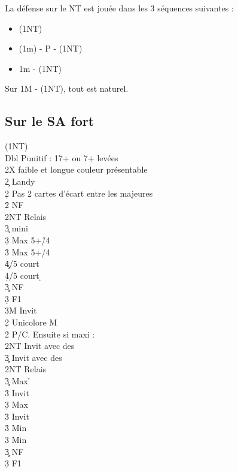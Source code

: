 \documentclass[a4paper]{article}
\begin{document}
La défense sur le NT est jouée dans les 3 séquences suivantes :

\begin{itemize}
\item (1NT)

\item (1m) - P - (1NT)

\item 1m - (1NT)

\end{itemize}

Sur 1M - (1NT), tout est naturel.

\subsection{Sur le SA fort}

\begin{bidtable}
(1NT)\+\\
Dbl \> Punitif : 17+ ou 7+ levées\\
\>2X faible et longue couleur présentable\\
2\c \> Landy\+\\
2\d \> Pas 2 cartes d'écart entre les majeures\\
2\h\s \> NF\\
2NT \> Relais\+\\
3\c \> mini\\
3\d \> Max 5+\h /4\s \\
3\h \> Max 5+\s /4\h \\
4\c {}/5 court \c \\
4\d {}/5 court \d \-\\
3\c \> NF\\
3\d \> F1\\
3M \> Invit\-\\
2\d \> Unicolore M\+\\
2\h\s \> P/C. Ensuite si maxi :\+\\
2NT \> Invit avec des \h \\
3\c\d \> Invit avec des \s \-\\
2NT \> Relais\+\\
3\c \> Max \h \+\\
3\h\s \> Invit\-\\
3\d \> Max \s \+\\
3\h\s \> Invit\-\\
3\h \> Min \h \\
3\s \> Min \s \-\\
3\c \> NF\\
3\d \> F1\\

\end{bidtable}
\end{document}
